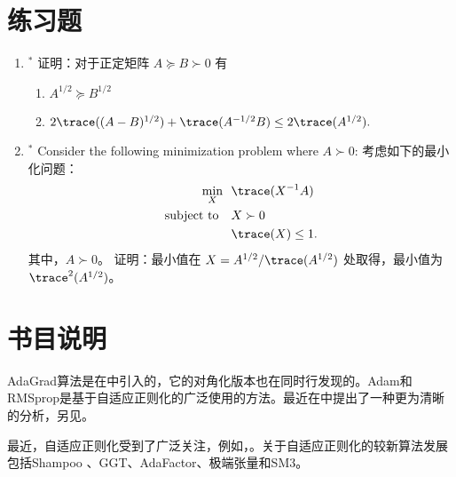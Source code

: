 \newpage
\section{
    练习题
    }

\begin{enumerate}


\item $^*$
证明：对于正定矩阵 $A \succcurlyeq B \succ 0$ 有
\begin{enumerate}
\item
$A^{1/2} \succcurlyeq B^{1/2} $
\item
$ 2 \trace( ({A - B})^{1/2}  )  + \trace( A^{-1/2}B)  \leq 2 \trace( {A}^{1/2} ).  $
\end{enumerate}

\item $^*$ 
Consider the  following minimization problem where $A \succ 0$:
考虑如下的最小化问题：
\begin{align*}
 \min_X \ \ &  \trace(X^{-1}A) \\
  \text{subject to  } \ \  & X \succ 0 \\
 &  \trace(X) \le 1.
\end{align*}
其中，$A \succ 0$。
证明：最小值在 $X = A^{1/2} / \trace(A^{1/2})$ 处取得，最小值为 $\trace^2(A^{1/2})$。


	
\end{enumerate}



\newpage
\section{
    书目说明
    }

AdaGrad算法是在\cite{DuchiHS10,duchi2011adaptive}中引入的，它的对角化版本也在\cite{McMahanS10}同时行发现的。Adam\cite{kingma2014adam}和RMSprop\cite{hinton2012neural}是基于自适应正则化的广泛使用的方法。最近在\cite{gupta2017unified}中提出了一种更为清晰的分析，另见\cite{deng2018optimal}。

最近，自适应正则化受到了广泛关注，例如，\cite{OrabonaC10,ward2018adagrad}。关于自适应正则化的较新算法发展包括Shampoo \cite{gupta2018shampoo}、GGT\cite{agarwal2018case}、AdaFactor\cite{shazeer2018adafactor}、极端张量\cite{chenET}和SM3\cite{anil2019memory}。
